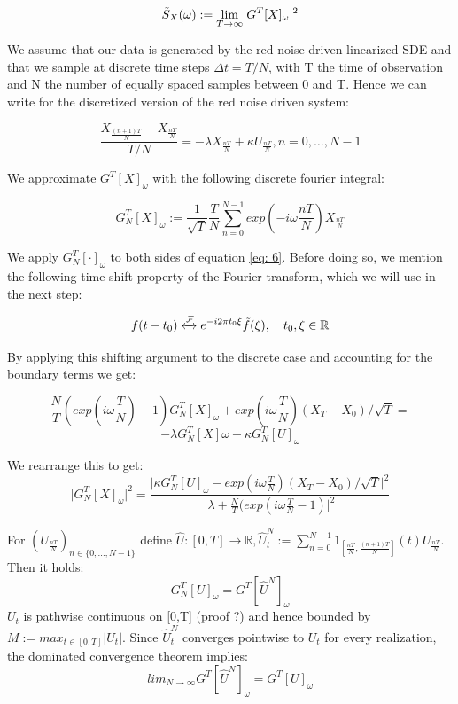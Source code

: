 \documentclass[%
thesis=student,%
coverpage=false,%
titlepage=false,%
headmarks=true, %
english,%
font=libertine, %
math=newpxtx, %
BCOR=5mm,%
coverBCOR=11mm%
]{tumbook}
\begin{document}
\[
    \Tilde{S}_{X}(\omega) := \lim_{T\rightarrow\infty} \lvert G^{T}[X]_{\omega}\rvert ^2
\]


We assume that our data is generated by the red noise driven linearized SDE and that we sample at discrete time steps $\Delta t = T/N$, with T the time of observation and N the number of equally spaced samples between 0 and T. Hence we can write for the discretized version of the red noise driven system:

        \begin{equation}  
        \frac{X_{\frac{(n+1)T}{N}}-X_{\frac{nT}{N}}}{T/N} = -\lambda X_{\frac{nT}{N}} + \kappa U_{\frac{nT}{N}}, n = 0, \dots, N-1 \label{eq: 6}
        \end{equation}


We approximate $G^{T}[X]_{\omega}$ with the following discrete fourier integral:

    \[
    G_{N}^{T}[X]_{\omega}:= \frac{1}{\sqrt{T}}\frac{T}{N}\sum_{n=0}^{N-1}exp(-i\omega\frac{nT}{N})X_{\frac{nT}{N}}
    \]


We apply $G_{N}^{T}[\cdot]_{\omega}$ to both sides of equation \ref{eq: 6}. Before doing so, we mention the following time shift property of the Fourier transform, which we will use in the next step:

\[
f(t-t_{0}) \xleftrightarrow{\mathcal{F}} e^{-i2\pi t_{0}\xi}\Tilde{f}(\xi), \ \ \ t_{0},\xi \in \mathbb{R}
\]

By applying this shifting argument to the discrete case and accounting for the boundary terms we get: 
        
    \[
    \frac{N}{T}(exp(i\omega\frac{T}{N})-1)G_{N}^{T}[X]_{\omega} + exp(i\omega\frac{T}{N})(X_{T}-X_{0})/\sqrt{T} = 
    \]
    \[
     -\lambda G_{N}^{T}[X]\omega + \kappa G_{N}^{T}[U]_{\omega}
    \]


We rearrange this to get:
    \[
    \lvert G_{N}^{T}[X]_{\omega}\rvert ^2 = \frac{\lvert \kappa G_{N}^{T}[U]_{\omega} - exp(i\omega\frac{T}{N})(X_{T}-X_{0})/\sqrt{T}\rvert ^2}{\lvert \lambda + \frac{N}{T}(exp(i\omega\frac{T}{N} - 1)\rvert^2}
    \]

For $(U_{\frac{nT}{N}})_{n \in \{0,...,N-1\}}$ define $\hat{U}:[0,T]\rightarrow\mathbb{R}, \hat{U}_{t}^{N} := \sum_{n=0}^{N-1}1_{[\frac{nT}{N},\frac{(n+1)T}{N}]}(t)U_{\frac{nT}{N}}$. Then it holds:
\[
G_{N}^{T}[U]_{\omega} = G^{T}[\hat{U}^{N}]_{\omega}
\]
$U_{t}$ is pathwise continuous on [0,T] (proof ?) and hence bounded by $M := max_{t\in [0,T]} \lvert U_{t} \rvert$. Since $\hat{U}_{t}^{N}$ converges pointwise to $U_{t}$ for every realization, the dominated convergence theorem implies:
\[
lim_{N\rightarrow\infty}G^{T}[\hat{U}^{N}]_{\omega} = G^{T}[U]_{\omega}
\]
\end{document}
